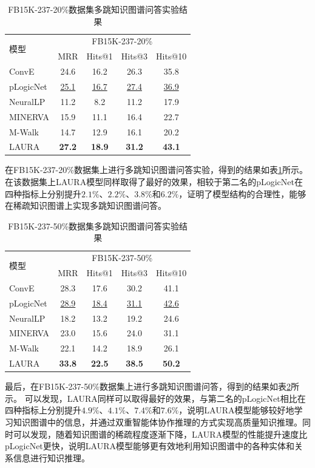 \documentclass[algorithmlist, AutoFakeBold, AutoFakeSlant, figurelist, tablelist, nomlist, engineering, openany]{seuthesix} %
\begin{document}
\begin{table}[t]
  \centering
  \caption{FB15K-237-20\%数据集多跳知识图谱问答实验结果}
  \begin{tabular*}{0.95\textwidth}{@{\extracolsep{\fill}}lcccc}
    \toprule[1pt]
    \multirow{2}{*}{模型} & \multicolumn{4}{c}{FB15K-237-20\%}   \\
      & MRR & Hits@1 & Hits@3 & Hits@10 \\ \hline
    ConvE & 24.6 & 16.2 & 26.3 & 35.8 \\
    pLogicNet & \underline{25.1} & \underline{16.7} & \underline{27.4} & \underline{36.9} \\
    NeuralLP & 11.2 & 8.2 & 11.2 & 17.9 \\
    MINERVA & 15.9 & 11.1 & 16.4 & 22.7 \\
    M-Walk & 14.7 & 12.9 & 16.1 & 20.2 \\
    LAURA & \textbf{27.2} & \textbf{18.9} & \textbf{31.2} & \textbf{43.1} \\
    \bottomrule[1pt]
  \end{tabular*}
  \label{Experiment2_FB15K-237-20}
\end{table}
在FB15K-237-20\%数据集上进行多跳知识图谱问答实验，得到的结果如表\ref{Experiment2_FB15K-237-20}所示。
在该数据集上LAURA模型同样取得了最好的效果，相较于第二名的pLogicNet在四种指标上分别提升$2.1\%$、$2.2\%$、$3.8\%$和$6.2\%$，证明了模型结构的合理性，能够在稀疏知识图谱上实现多跳知识图谱问答。

\begin{table}[t]
  \centering
  \caption{FB15K-237-50\%数据集多跳知识图谱问答实验结果}
  \begin{tabular*}{0.95\textwidth}{@{\extracolsep{\fill}}lcccc}
    \toprule[1pt]
    \multirow{2}{*}{模型} & \multicolumn{4}{c}{FB15K-237-50\%}   \\
      & MRR & Hits@1 & Hits@3 & Hits@10 \\ \hline
    ConvE & 28.3 & 17.6 & 30.2 & 41.1 \\
    pLogicNet & \underline{28.9} & \underline{18.4} & \underline{31.1} & \underline{42.6} \\
    NeuralLP & 18.2 & 13.2 & 19.2 & 24.6 \\
    MINERVA & 23.0 & 15.6 & 24.0 & 31.1 \\
    M-Walk & 22.1 & 14.2 & 18.9 & 26.1 \\
    LAURA & \textbf{33.8} & \textbf{22.5} & \textbf{38.5} & \textbf{50.2} \\
    \bottomrule[1pt]
  \end{tabular*}
  \label{Experiment2_FB15K-237-50}
\end{table}
最后，在FB15K-237-50\%数据集上进行多跳知识图谱问答，得到的结果如表\ref{Experiment2_FB15K-237-50}所示。
可以发现，LAURA同样可以取得最好的效果，与第二名的pLogicNet相比在四种指标上分别提升$4.9\%$、$4.1\%$、$7.4\%$和$7.6\%$，说明LAURA模型能够较好地学习知识图谱中的信息，并通过双重智能体协作推理的方式实现高质量知识推理。同时可以发现，随着知识图谱的稀疏程度逐渐下降，LAURA模型的性能提升速度比pLogicNet更快，说明LAURA模型能够更有效地利用知识图谱中的各种实体和关系信息进行知识推理。
\end{document}
